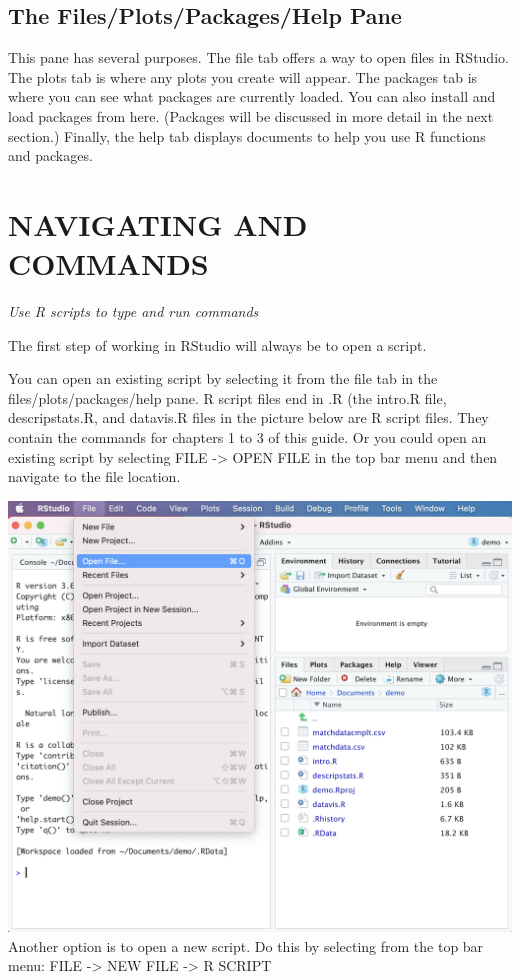 \documentclass[
]{book}
\begin{document}
\hypertarget{the-filesplotspackageshelp-pane}{%
\subsection{The Files/Plots/Packages/Help Pane}\label{the-filesplotspackageshelp-pane}}

This pane has several purposes. The file tab offers a way to open files in RStudio. The plots tab is where any plots you create will appear. The packages tab is where you can see what packages are currently loaded. You can also install and load packages from here. (Packages will be discussed in more detail in the next section.) Finally, the help tab displays documents to help you use R functions and packages.

\hypertarget{navigating-and-commands}{%
\section{NAVIGATING AND COMMANDS}\label{navigating-and-commands}}

\emph{Use R scripts to type and run commands}

The first step of working in RStudio will always be to open a script.

You can open an existing script by selecting it from the file tab in the files/plots/packages/help pane. R script files end in .R (the intro.R file, descripstats.R, and datavis.R files in the picture below are R script files. They contain the commands for chapters 1 to 3 of this guide. Or you could open an existing script by selecting FILE -\textgreater{} OPEN FILE in the top bar menu and then navigate to the file location.

\includegraphics{img/NAVIGATING AND COMMANDS R15.png}\\
Another option is to open a new script. Do this by selecting from the top bar menu: FILE -\textgreater{} NEW FILE -\textgreater{} R SCRIPT
\end{document}
